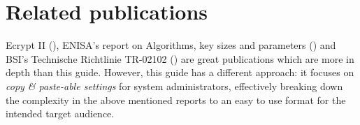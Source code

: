 \section{Related publications}


Ecrypt II (\cite{ii2011ecrypt}), ENISA's report on Algorithms, key sizes and
parameters (\cite{ENISA2013}) and BSI's Technische Richtlinie TR-02102 (\cite{TR02102}) are
great publications which are more in depth than this guide.  However, this guide
has a different approach: it focuses on \emph{copy \& paste-able settings} for
system administrators, effectively breaking down the complexity in the above
mentioned reports to an easy to use format for the intended target audience. 




